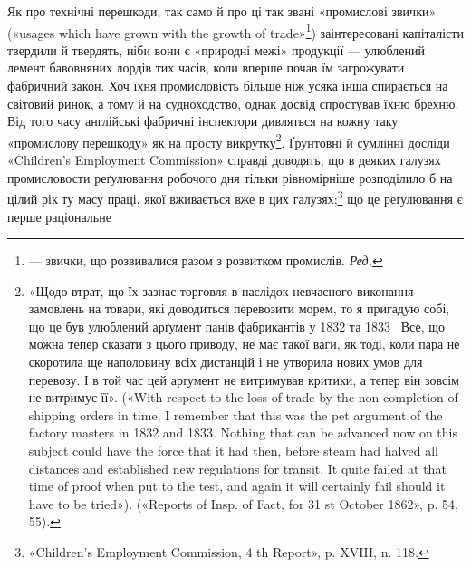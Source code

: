Як про технічні перешкоди, так само й про ці так звані «промислові звички» («usages which have grown
with the growth of
trade»\footnote*{
— звички, що розвивалися разом з розвитком промислів. \emph{Ред.}
}) заінтересовані капіталісти твердили й твердять, ніби
вони є «природні межі» продукції — улюблений лемент бавовняних лордів тих часів, коли вперше почав
їм загрожувати фабричний закон. Хоч їхня промисловість більше ніж усяка інша
спирається на світовий ринок, а тому й на судноходство, однак
досвід спростував їхню брехню. Від того часу англійські фабричні
інспектори дивляться на кожну таку «промислову перешкоду»
як на просту викрутку\footnote{
«Щодо втрат, що їх зазнає торговля в наслідок невчасного виконання замовлень на товари, які
доводиться перевозити морем, то я пригадую
собі, що це був улюблений арґумент панів фабрикантів у 1832 та 1833~
Все, що можна тепер сказати з цього приводу, не має такої ваги, як тоді,
коли пара не скоротила ще наполовину всіх дистанцій і не утворила нових
умов для перевозу. І в той час цей арґумент не витримував критики, а
тепер він зовсім не витримує її». («With respect to the loss of trade by
the non-completion of shipping orders in time, I remember that this was
the pet argument of the factory masters in 1832 and 1833. Nothing that
can be advanced now on this subject could have the force that it had then,
before steam had halved all distances and established new regulations
for transit. It quite failed at that time of proof when put to the test, and
again it will certainly fail should it have to be tried»). («Reports of Insp.
of Fact, for 31 st October 1862», p. 54, 55).
}. Ґрунтовні й сумлінні досліди «Children’s
Employment Commission» справді доводять, що в деяких
галузях промисловости реґулювання робочого дня тільки рівномірніше розподілило б на цілий рік ту
масу праці, якої вживається вже в цих галузях;\footnote{
«Children’s Employment Commission, 4 th Report», p. XVIII,
n. 118.
} що це реґулювання є перше раціональне
